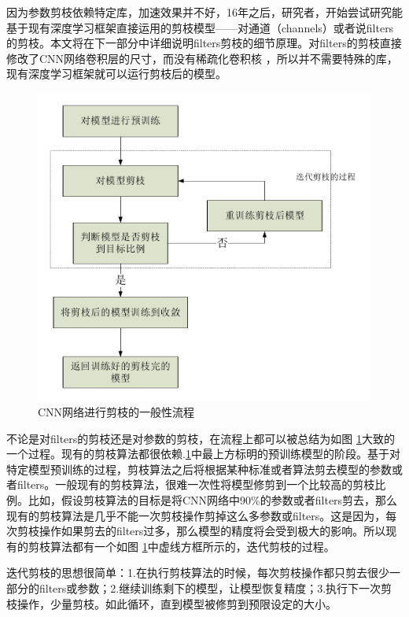 \documentclass[ pdftex, oneside, master]{NJUthesis}
\begin{document}
因为参数剪枝依赖特定库，加速效果并不好，16年之后，研究者\cite{17}，\cite{13}开始尝试研究能基于现有深度学习框架直接运用的剪枝模型——对通道（channels）或者说filters的剪枝。本文将在下一部分中详细说明filters剪枝的细节原理。对filters的剪枝直接修改了CNN网络卷积层的尺寸，而没有稀疏化卷积核 ，所以并不需要特殊的库，现有深度学习框架就可以运行剪枝后的模型。

\begin{figure}
\centering
\includegraphics[width=\textwidth]{pruning_liucheng.pdf}
\caption{CNN网络进行剪枝的一般性流程}
\label{pruning_liucheng}
\end{figure}

不论是对filters的剪枝还是对参数的剪枝，在流程上都可以被总结为如图 \ref{pruning_liucheng}大致的一个过程。现有的剪枝算法都很依赖.\ref{pruning_liucheng}中最上方标明的预训练模型的阶段。基于对特定模型预训练的过程，剪枝算法之后将根据某种标准或者算法剪去模型的参数或者filters。一般现有的剪枝算法，很难一次性将模型修剪到一个比较高的剪枝比例。比如，假设剪枝算法的目标是将CNN网络中90\%的参数或者filters剪去，那么现有的剪枝算法是几乎不能一次剪枝操作剪掉这么多参数或filters。这是因为，每次剪枝操作如果剪去的filters过多，那么模型的精度将会受到极大的影响。所以现有的剪枝算法都有一个如图 \ref{pruning_liucheng}中虚线方框所示的，迭代剪枝的过程。

迭代剪枝的思想很简单：1.在执行剪枝算法的时候，每次剪枝操作都只剪去很少一部分的filters或参数；2.继续训练剩下的模型，让模型恢复精度；3.执行下一次剪枝操作，少量剪枝。如此循环，直到模型被修剪到预限设定的大小。
\end{document}
